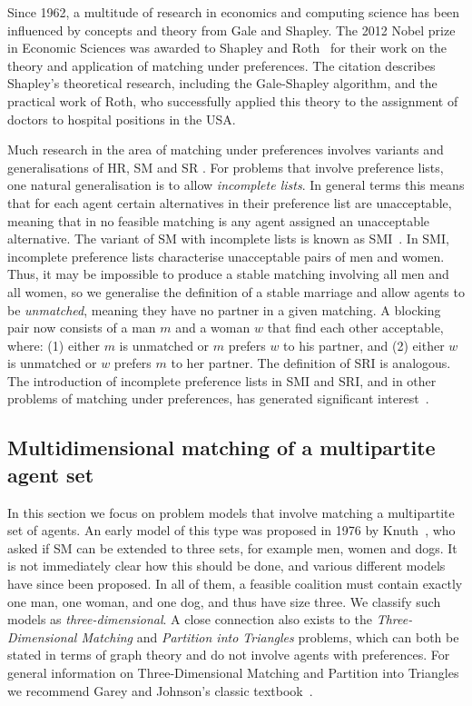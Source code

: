 Since 1962, a multitude of research in economics and computing science has been influenced by concepts and theory from Gale and Shapley. The 2012 Nobel prize in Economic Sciences was awarded to Shapley and Roth~\cite{RothShapleyNobelPrize} for their work on the theory and application of matching under preferences. The citation describes Shapley's theoretical research, including the Gale-Shapley algorithm, and the practical work of Roth, who successfully applied this theory to the assignment of doctors to hospital positions in the USA.

Much research in the area of matching under preferences involves variants and generalisations of HR, SM and SR \cite{AMUP}. For problems that involve preference lists, one natural generalisation is to allow \emph{incomplete lists}. In general terms this means that for each agent certain alternatives in their preference list are unacceptable, meaning that in no feasible matching is any agent assigned an unacceptable alternative. The variant of SM with incomplete lists is known as SMI~\cite{AMUP}. In SMI, incomplete preference lists characterise unacceptable pairs of men and women. Thus, it may be impossible to produce a stable matching involving all men and all women, so we generalise the definition of a stable marriage and allow agents to be \emph{unmatched}, meaning they have no partner in a given matching. A blocking pair now consists of a man $m$ and a woman $w$ that find each other acceptable, where: (1) either $m$ is unmatched or $m$ prefers $w$ to his partner, and (2) either $w$ is unmatched or $w$ prefers $m$ to her partner. The definition of SRI is analogous. The introduction of incomplete preference lists in SMI and SRI, and in other problems of matching under preferences, has generated significant interest~\cite{AMUP}.

\subsection{Multidimensional matching of a multipartite agent set}
\label{sec:lit_review_multidimensionalmatching}

In this section we focus on problem models that involve matching a multipartite set of agents. An early model of this type was proposed in 1976 by Knuth~\cite[Problem~11]{Knu97english}, who asked if SM can be extended to three sets, for example men, women and dogs. It is not immediately clear how this should be done, and various different models have since been proposed. In all of them, a feasible coalition must contain exactly one man, one woman, and one dog, and thus have size three. We classify such models as \emph{three-dimensional}. A close connection also exists to the \emph{Three-Dimensional Matching} and \emph{Partition into Triangles} problems, which can both be stated in terms of graph theory and do not involve agents with preferences.  For general information on Three-Dimensional Matching and Partition into Triangles we recommend Garey and Johnson's classic textbook~\cite{GJ79}. 


